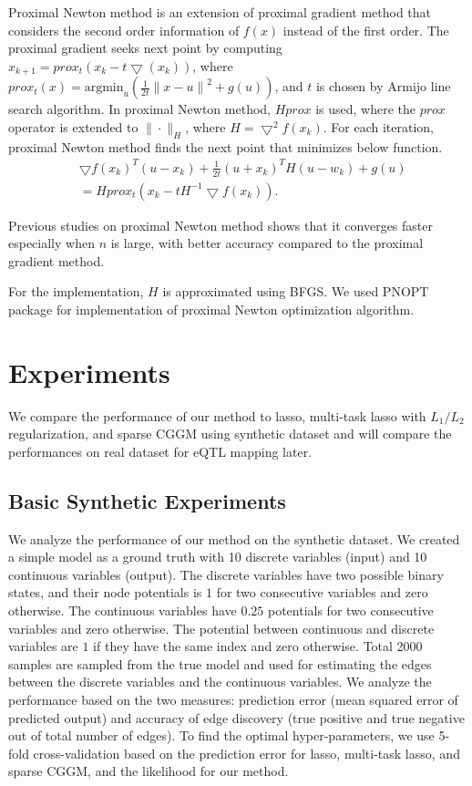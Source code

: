 \documentclass{article}
\begin{document}
Proximal Newton method is an extension of proximal gradient method that considers the second order information of $f(x)$ instead of the first order.
The proximal gradient seeks next point by computing $x_{k+1} = prox_t (x_k - t \bigtriangledown(x_k))$, where $prox_t(x)=\text{argmin}_u(\frac{1}{2t}{\|x-u\|}^2 + g(u))$, and $t$ is chosen by Armijo line search algorithm. In proximal Newton method, $Hprox$ is used, where the $prox$ operator is extended to $\| \cdot \|_H$, where $H=\bigtriangledown^2 f(x_k)$. For each iteration, proximal Newton method finds the next point that minimizes below function.
\begin{align}
  &\bigtriangledown f(x_k)^T(u-x_k)+\frac{1}{2t}(u+x_k)^TH(u-w_k)+g(u) \nonumber    \\
 & =  Hprox_t(x_k-tH^{-1}\bigtriangledown f(x_k)).
\end{align}

Previous studies on proximal Newton method \cite{lee2012proximal} shows that it converges faster especially when $n$ is large, with better accuracy compared to the proximal gradient method.

For the implementation, $H$ is approximated using BFGS.
We used PNOPT package \cite{lee2012proximal} for implementation of proximal Newton optimization algorithm.



\section{Experiments}
We compare the performance of our method to lasso, multi-task lasso with $L_1/L_2$ regularization, and sparse CGGM using synthetic dataset and will compare the performances on real dataset for eQTL mapping later.

\subsection{Basic Synthetic Experiments}
We analyze the performance of our method on the synthetic dataset. We created a simple model as a ground truth with 10 discrete variables (input) and 10 continuous variables (output). The discrete variables have two possible binary states, and their node potentials is $1$ for two consecutive variables and zero otherwise. The continuous variables have $0.25$ potentials for two consecutive variables and zero otherwise. The potential between continuous and discrete variables are $1$ if they have the same index and zero otherwise.  Total 2000 samples are sampled from the true model and used for estimating the edges between the discrete variables and the continuous variables. We analyze the performance based on the two measures: prediction error (mean squared error of predicted output) and accuracy of edge discovery (true positive and true negative out of total number of edges). To find the optimal hyper-parameters, we use 5-fold cross-validation based on the prediction error for lasso, multi-task lasso, and sparse CGGM, and the likelihood for our method.
\end{document}
